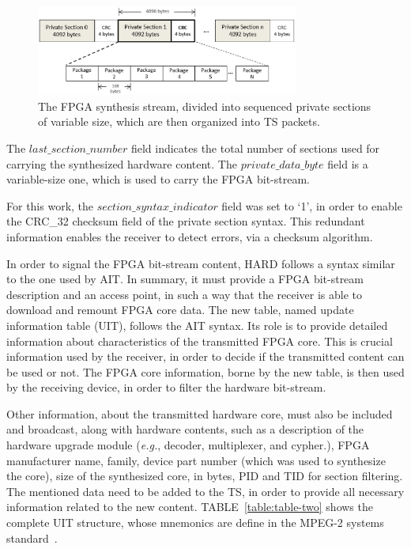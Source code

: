 %
\begin{figure}[ht]
\centering
\includegraphics[width=3.4in]{images/Fig5.eps}
\caption{The FPGA synthesis stream, divided into sequenced private sections of variable size, which are then organized into TS packets.}
\label{figure:fig5}
\end{figure}
%


The $last\_section\_number$ field indicates the total number of sections used for carrying the synthesized hardware content. The $private\_data\_byte$ field is a variable-size one, which is used to carry the FPGA bit-stream. 

For this work, the $section\_syntax\_indicator$ field was set to `1', in order to enable the CRC\_32 checksum field of the private section syntax. This redundant information enables the receiver to detect errors, via a checksum algorithm.

In order to signal the FPGA bit-stream content, HARD follows a syntax similar to the one used by AIT. In summary, it must provide a FPGA bit-stream description and an access point, in such a way that the receiver is able to download and remount FPGA core data. The new table, named update information table (UIT), follows the AIT syntax. Its role is to provide detailed information about characteristics of the transmitted FPGA core. This is crucial information used by the receiver, in order to decide if the transmitted content can be used or not. The FPGA core information, borne by the new table, is then used by the receiving device, in order to filter the hardware bit-stream.

Other information, about the transmitted hardware core, must also be included and broadcast, along with hardware contents, such as a description of the hardware upgrade module ({\em e.g.}, decoder, multiplexer, and cypher.), FPGA manufacturer name, family, device part number (which was used to synthesize the core), size of the synthesized core, in bytes, PID and TID for section filtering. The mentioned data need to be added to the TS, in order to provide all necessary information related to the new content. TABLE~\ref{table:table-two} shows the complete UIT structure, whose mnemonics are define in the MPEG-2 systems standard~\cite{ref17}.

